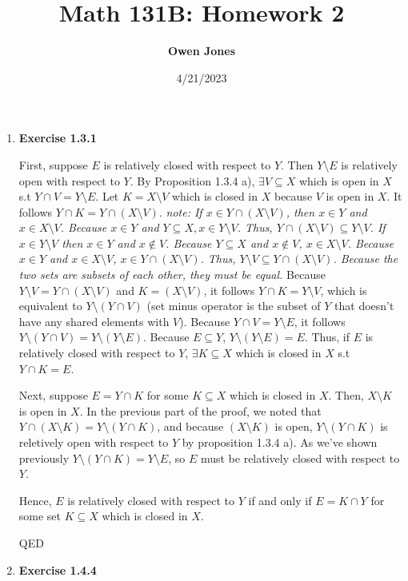 \documentclass[10pt]{article}
\title{\bf Math 131B: Homework 2}
\date{4/21/2023}
\author{\bf Owen Jones}
\begin{document}
\maketitle

\begin{enumerate}[label=Problem \arabic*.]
    \item \textbf{Exercise 1.3.1} \par
    First, suppose $E$ is relatively closed with respect to $Y$. Then $Y\setminus E$ is relatively open with respect to $Y$. By Proposition 1.3.4 a), $\exists V\subseteq X$ which is open in $X$ s.t $Y\cap V=Y\setminus E$. Let $K=X\setminus V$ which is closed in $X$ because $V$ is open in $X$.
    It follows $Y\cap K=Y\cap (X\setminus V)$. \textit{note: If $x\in Y\cap (X\setminus V)$, then $x\in Y$ and $x\in X\setminus V$. Because $x\in Y$ and $Y\subseteq X, x\in Y\setminus V$. Thus, $Y\cap (X\setminus V)\subseteq Y\setminus V$. 
    If $x\in Y\setminus V$ then $x\in Y$ and $x \notin V$. Because $Y\subseteq X$ and $x\notin V$, $x\in X\setminus V$. Because $x\in Y$ and $x\in X\setminus V$, $x\in Y\cap (X\setminus V)$. Thus, $Y\setminus V\subseteq Y\cap (X\setminus V)$. Because the two sets are subsets of each other, they must be equal.}
    Because $Y\setminus V=Y\cap (X\setminus V)$ and $K=(X\setminus V)$, it follows $Y\cap K=Y\setminus V$, which is equivalent to $Y\setminus (Y\cap V)$ (set minus operator is the subset of $Y$ that doesn't have any shared elements with $V$). Because $Y\cap V=Y\setminus E$, it follows $Y\setminus (Y\cap V)=Y\setminus (Y\setminus E)$. Because $E\subseteq Y$, $Y\setminus (Y\setminus E)=E$.
    Thus, if $E$ is relatively closed with respect to $Y$, $\exists K\subseteq X$ which is closed in $X$ s.t $Y\cap K=E$.\par 
    Next, suppose $E=Y\cap K$ for some $K\subseteq X$ which is closed in $X$. Then, $X\setminus K$ is open in $X$. In the previous part of the proof, we noted that $Y\cap (X\setminus K)=Y\setminus (Y\cap K)$, and because $(X\setminus K)$ is open, $Y\setminus (Y\cap K)$ is reletively open with respect to $Y$ by proposition 1.3.4 a). As we've shown previously $Y\setminus (Y\cap K)=Y\setminus E$, so $E$ must be relatively closed with respect to $Y$.\par
    Hence, $E$ is relatively closed with respect to $Y$ if and only if $E=K\cap Y$ for some set $K\subseteq X$ which is closed in $X$.\par 
    QED
    \item \textbf{Exercise 1.4.4} \par

\end{enumerate}
\end{document}
